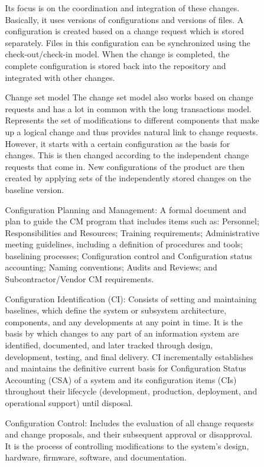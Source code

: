 \documentclass{article}
\begin{document}
\begin{itemize}
\begin{itemize}
\begin{itemize}
    Its focus is on the coordination and integration of these changes. Basically, it uses versions of configurations and versions of files.
    A configuration is created based on a change request which is stored separately. Files in this configuration can be synchronized using the check-out/check-in model.
    When the change is completed, the complete configuration is stored back into the repository and integrated with other changes.
    \item[Change set model]
    The change set model also works based on change requests and has a lot in common with the long transactions model. Represents the set of modifications to different components that make up
    a logical change and thus provides natural link to change requests. However, it starts with a certain configuration as the basis for changes.
    This is then changed according to the independent change requests that come in.
    New configurations of the product are then created by applying sets of the independently stored changes on the baseline version.
    \end{itemize}
    \begin{itemize}
    \item [Configuration Planning and Management:] A formal document and plan to guide the CM program that includes items such as:
    Personnel; Responsibilities and Resources; Training requirements; Administrative meeting guidelines, including a definition of procedures and tools;
    baselining processes; Configuration control and Configuration status accounting; Naming conventions; Audits and Reviews; and Subcontractor/Vendor CM requirements.
    \item [Configuration Identification (CI):] Consists of setting and maintaining baselines, which define the system or subsystem architecture,
    components, and any developments at any point in time. It is the basis by which changes to any part of an information system are identified, documented,
    and later tracked through design, development, testing, and final delivery. CI incrementally establishes and maintains the definitive current basis for Configuration Status Accounting (CSA)
    of a system and its configuration items (CIs) throughout their lifecycle (development, production, deployment, and operational support) until disposal.
    \item[Configuration Control:] Includes the evaluation of all change requests and change proposals, and their subsequent approval or disapproval.
    It is the process of controlling modifications to the system's design, hardware, firmware, software, and documentation.

\end{itemize}
\end{itemize}
\end{itemize}
\end{document}
